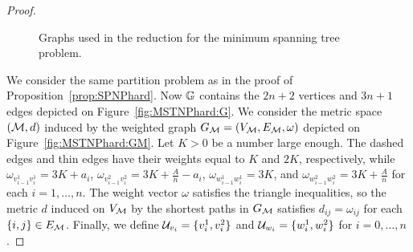 \documentclass[12pt]{article}
\begin{document}
\begin{proof}
\begin{figure}
{
\label{fig:MSTNPhard:GM}
}
\caption{\label{fig:MSTNPhard} Graphs used in the reduction for the minimum spanning tree problem.}
\end{figure}


 We consider the same partition problem as in the proof of Proposition~\ref{prop:SPNPhard}. Now $\mathbb{G}$ contains the $2n+2$ vertices and $3n+1$ edges depicted on Figure~\ref{fig:MSTNPhard:G}. We consider the metric space $(\mathcal{M},d)$ induced by the weighted graph $G_{\mathcal{M}}=(V_{\mathcal{M}},E_{\mathcal{M}},\omega)$ depicted on Figure~\ref{fig:MSTNPhard:GM}. Let $K>0$ be a number large enough. The dashed edges and thin edges have their weights equal to $K$ and $2K$, respectively, while $\omega_{v_{i-1}^1v_{i}^1}=3K+a_i$, $\omega_{v_{i-1}^2v_{i}^2}=3K+\frac{A}{n}-a_i$, $\omega_{w_{i-1}^1w_{i}^1}=3K$, and $\omega_{w_{i-1}^2w_{i}^2}=3K+\frac{A}{n}$ for each $i=1,\ldots,n$. The weight vector $\omega$ satisfies the triangle inequalities, so the metric $d$ induced on $V_{\mathcal{M}}$ by the shortest paths in $G_{\mathcal{M}}$ satisfies $d_{ij}=\omega_{ij}$ for each $\{i,j\}\in E_{\mathcal{M}}$.
 Finally, we define $\mathcal{U}_{v_i}=\{v_i^1,v_i^2\}$ and $\mathcal{U}_{w_i}=\{w_i^1,w_i^2\}$ for $i=0,\ldots,n$.
 

\end{proof}
\end{document}
